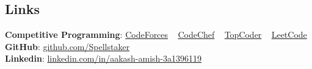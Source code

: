 \documentclass[margin, centered]{res}
\begin{document}
\begin{resume}
		\section{Links}
			\textbf{Competitive Programming}:
			\href{https://codeforces.com/profile/spellstaker}{CodeForces}
			~
			\href{https://www.codechef.com/users/spellstaker}{CodeChef}
			~
			\href{https://topcoder.com/members/spellstaker/}{TopCoder}
			~
			\href{https://leetcode.com/spellstaker/}{LeetCode}
			\\
			\textbf{GitHub}: \href{https://github.com/Spellstaker}{github.com/Spellstaker}
			\\
			\textbf{Linkedin}: \href{https://www.linkedin.com/in/aakash-amish-3a1396119/}{linkedin.com/in/aakash-amish-3a1396119}
	\end{resume}
\end{document}
